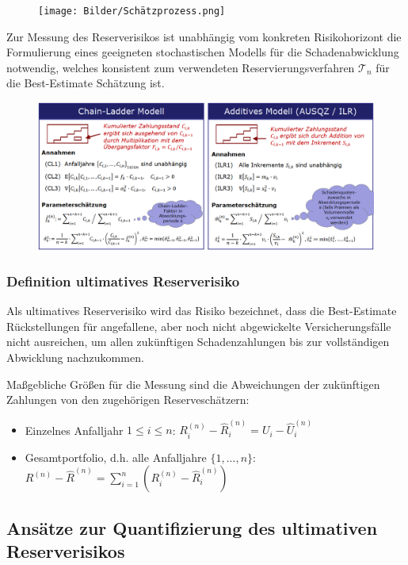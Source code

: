 \documentclass[12pt]{report}
\theoremstyle{dotless}
\theoremstyle{definition}
\begin{document}
\begin{figure}[ht]
	\centering
	\texttt{[image: Bilder/Schätzprozess.png]}
\end{figure}

Zur Messung des Reserverisikos ist unabhängig vom konkreten Risikohorizont die Formulierung eines geeigneten stochastischen Modells für die Schadenabwicklung notwendig, welches konsistent zum  verwendeten Reservierungsverfahren $\mathcal{T}_n$ für die Best-Estimate Schätzung ist.

\begin{figure}[ht]
	\centering
	\includegraphics[width= \textwidth]{Bilder/Modelle.png}
\end{figure}


\subsubsection{Definition ultimatives Reserverisiko}
Als ultimatives Reserverisiko wird das Risiko bezeichnet, dass die Best-Estimate
Rückstellungen für angefallene, aber noch nicht abgewickelte Versicherungsfälle nicht
ausreichen, um allen zukünftigen Schadenzahlungen bis zur vollständigen Abwicklung
nachzukommen.

Maßgebliche Größen für die Messung sind die Abweichungen der zukünftigen Zahlungen von den zugehörigen Reserveschätzern:
\begin{itemize}
\item Einzelnes Anfalljahr $1 \leq i \leq n$: $R^{(n)}_i - \hat{R}^{(n)}_i= U_i - \hat{U}^{(n)}_i$
\item Gesamtportfolio, d.h. alle Anfalljahre $\{1,...,n\}$: $R^{(n)} - \hat{R}^{(n)} = \sum^n_{i=1} (R^{(n)}_i - \hat{R}^{(n)}_i)$
\end{itemize}


\subsection{Ansätze zur Quantifizierung des ultimativen Reserverisikos}
\end{document}

